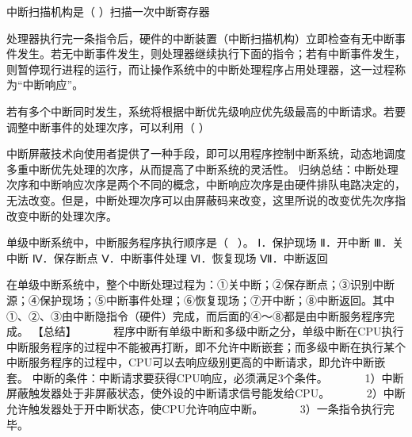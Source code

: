 \question 中断扫描机构是（ ）扫描一次中断寄存器
\par{}
\begin{solution}处理器执行完一条指令后，硬件的中断装置（中断扫描机构）立即检查有无中断事件发生。若无中断事件发生，则处理器继续执行下面的指令；若有中断事件发生，则暂停现行进程的运行，而让操作系统中的中断处理程序占用处理器，这一过程称为``中断响应''。
\end{solution}
\question 若有多个中断同时发生，系统将根据中断优先级响应优先级最高的中断请求。若要调整中断事件的处理次序，可以利用（
）
\par{}
\begin{solution}中断屏蔽技术向使用者提供了一种手段，即可以用程序控制中断系统，动态地调度多重中断优先处理的次序，从而提高了中断系统的灵活性。
归纳总结：中断处理次序和中断响应次序是两个不同的概念，中断响应次序是由硬件排队电路决定的，无法改变。但是，中断处理次序可以由屏蔽码来改变，这里所说的改变优先次序指改变中断的处理次序。
\end{solution}
\question 单级中断系统中，中断服务程序执行顺序是（ ~）。 Ⅰ．保护现场 Ⅱ．开中断
Ⅲ．关中断 Ⅳ．保存断点 Ⅴ．中断事件处理 Ⅵ．恢复现场 Ⅶ．中断返回
\par{}
\begin{solution}在单级中断系统中，整个中断处理过程为：①关中断；②保存断点；③识别中断源；④保护现场；⑤中断事件处理；⑥恢复现场；⑦开中断；⑧中断返回。其中①、②、③由中断隐指令（硬件）完成，而后面的④～⑧都是由中断服务程序完成。
【总结】 ~ ~ ~
~程序中断有单级中断和多级中断之分，单级中断在CPU执行中断服务程序的过程中不能被再打断，即不允许中断嵌套；而多级中断在执行某个中断服务程序的过程中，CPU可以去响应级别更高的中断请求，即允许中断嵌套。
中断的条件：中断请求要获得CPU响应，必须满足3个条件。 ~ ~ ~
~1）中断屏蔽触发器处于非屏蔽状态，使外设的中断请求信号能发给CPU。 ~ ~ ~
~2）中断允许触发器处于开中断状态，使CPU允许响应中断。 ~ ~ ~
~3）一条指令执行完毕。
\end{solution}

